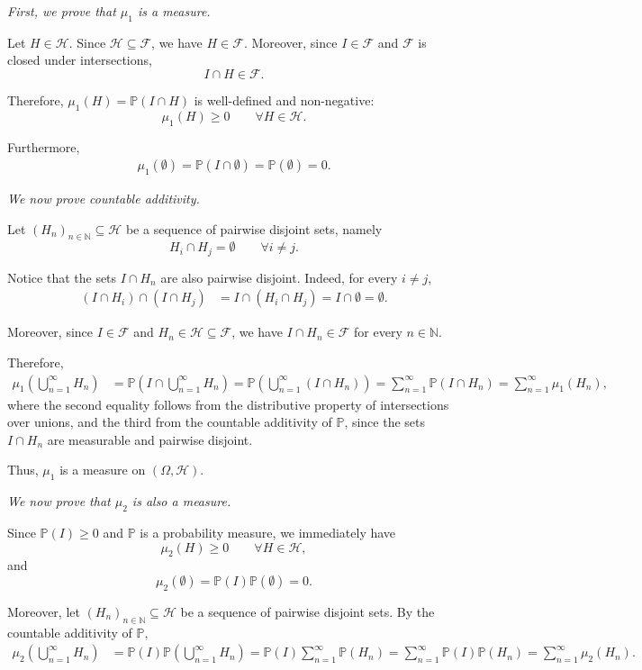 \documentclass[11pt,a4paper]{article}
\begin{document}
\emph{First, we prove that $\mu_1$ is a measure.}

Let $H\in\mathcal H$. Since $\mathcal H\subseteq\mathcal F$, we have $H\in\mathcal F$. Moreover, since $I\in\mathcal F$ and $\mathcal F$ is closed under intersections,
\[
I\cap H\in\mathcal F.
\]

Therefore, $\mu_1(H)=\mathbb P(I\cap H)$ is well-defined and non-negative:
\[
\mu_1(H)\ge0
\qquad\forall H\in\mathcal H.
\]

Furthermore,
\[
\begin{aligned}
\mu_1(\emptyset)
=\mathbb P(I\cap\emptyset) =\mathbb P(\emptyset) =0.
\end{aligned}
\]

\emph{We now prove countable additivity.}

Let $(H_n)_{n\in\mathbb N}\subseteq\mathcal H$ be a sequence of pairwise disjoint sets, namely
\[
H_i\cap H_j=\emptyset
\qquad\forall i\neq j.
\]

Notice that the sets $I\cap H_n$ are also pairwise disjoint. Indeed, for every $i\neq j$,
\[
\begin{aligned}
(I\cap H_i)\cap(I\cap H_j)
&=I\cap(H_i\cap H_j) =I\cap\emptyset =\emptyset.
\end{aligned}
\]

Moreover, since $I\in\mathcal F$ and $H_n\in\mathcal H\subseteq\mathcal F$, we have $I\cap H_n\in\mathcal F$ for every $n\in\mathbb N$.

Therefore,
\[
\begin{aligned}
\mu_1\left(\bigcup_{n=1}^{\infty}H_n\right)
&=\mathbb P\left(I\cap\bigcup_{n=1}^{\infty}H_n\right) =\mathbb P\left(\bigcup_{n=1}^{\infty}(I\cap H_n)\right) =\sum_{n=1}^{\infty}\mathbb P(I\cap H_n) =\sum_{n=1}^{\infty}\mu_1(H_n),
\end{aligned}
\]
where the second equality follows from the distributive property of intersections over unions, and the third from the countable additivity of $\mathbb P$, since the sets $I\cap H_n$ are measurable and pairwise disjoint.

Thus, $\mu_1$ is a measure on $(\Omega,\mathcal H)$.

\emph{We now prove that $\mu_2$ is also a measure.}

Since $\mathbb P(I)\ge0$ and $\mathbb P$ is a probability measure, we immediately have
\[
\mu_2(H)\ge0
\qquad\forall H\in\mathcal H,
\]
and
\[
\mu_2(\emptyset)
=\mathbb P(I)\mathbb P(\emptyset)
=0.
\]

Moreover, let $(H_n)_{n\in\mathbb N}\subseteq\mathcal H$ be a sequence of pairwise disjoint sets. By the countable additivity of $\mathbb P$,
\[
\begin{aligned}
\mu_2\left(\bigcup_{n=1}^{\infty}H_n\right)
&=\mathbb P(I)\mathbb P\left(\bigcup_{n=1}^{\infty}H_n\right) =\mathbb P(I)\sum_{n=1}^{\infty}\mathbb P(H_n) =\sum_{n=1}^{\infty}\mathbb P(I)\mathbb P(H_n) =\sum_{n=1}^{\infty}\mu_2(H_n).
\end{aligned}
\]
\end{document}
